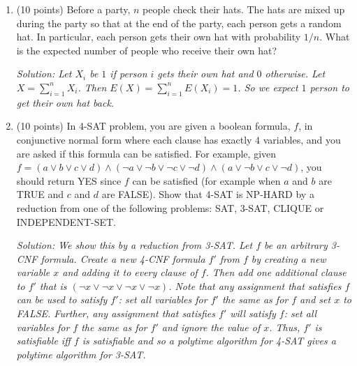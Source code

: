 \documentclass[11pt]{article}
\newcommand{\ans}[1]{\emph{Solution: #1}}
\begin{document}
\begin{enumerate}
\begin{enumerate}
\end{enumerate}



\begin{enumerate}

\item (10 points) Before a party, $n$ people check their hats.  The hats are mixed up during the party so that at the end of the party, each person gets a random hat.  In particular, each person gets their own hat with probability $1/n$.  What is the expected number of people who receive their own hat?

\ans{Let $X_{i}$ be $1$ if person $i$ gets their own hat and $0$ otherwise.  Let $X = \sum_{i=1}^{n} X_{i}$.  Then $E(X) = \sum_{i=1}^{n} E(X_{i}) = 1$.  So we expect $1$ person to get their own hat back.}






\pagebreak

\item (10 points) In 4-SAT problem, you are given a boolean formula, $f$, in conjunctive normal form where each clause has exactly $4$ variables, and you are asked if this formula can be satisfied.  For example, given $f = (a \lor b \lor c \lor d) \land (\lnot{a} \lor \lnot{b} \lor \lnot{c} \lor \lnot{d}) \land (a \lor \lnot{b} \lor c \lor \lnot{d}) $, you should return YES since $f$ can be satisfied (for example when $a$ and $b$ are TRUE and $c$ and $d$ are FALSE).  Show that 4-SAT is NP-HARD by a reduction from one of the following problems: SAT, 3-SAT, CLIQUE or INDEPENDENT-SET.

\ans{We show this by a reduction from 3-SAT.  Let $f$ be an arbitrary 3-CNF formula.  Create a new 4-CNF formula $f'$ from $f$ by creating a new variable $x$ and adding it to every clause of $f$.  Then add one additional clause to $f'$ that is $(\lnot{x} \lor \lnot{x} \lor \lnot{x} \lor \lnot{x})$.  Note that any assignment that satisfies $f$ can be used to satisfy $f'$: set all variables for $f'$ the same as for $f$ and set $x$ to FALSE.  Further, any assignment that satisfies $f'$ will satisfy $f$: set all variables for $f$ the same as for $f'$ and ignore the value of $x$.  Thus, $f'$ is satisfiable iff $f$ is satisfiable and so a polytime algorithm for 4-SAT gives a polytime algorithm for 3-SAT.}



\end{enumerate}




\end{enumerate}
\end{document}
